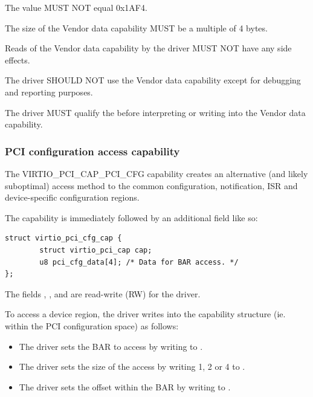 The value  MUST NOT equal 0x1AF4.

The size of the Vendor data capability MUST be a multiple of 4 bytes.

Reads of the Vendor data capability by the driver MUST NOT have any
side effects.


The driver SHOULD NOT use the Vendor data capability except
for debugging and reporting purposes.

The driver MUST qualify the  before
interpreting or writing into the Vendor data capability.

\subsubsection{PCI configuration access capability}\label{sec:Virtio Transport Options / Virtio Over PCI Bus / PCI Device Layout / PCI configuration access capability}

The VIRTIO_PCI_CAP_PCI_CFG capability
creates an alternative (and likely suboptimal) access method to the
common configuration, notification, ISR and device-specific configuration regions.

The capability is immediately followed by an additional field like so:

\begin{lstlisting}
struct virtio_pci_cfg_cap {
        struct virtio_pci_cap cap;
        u8 pci_cfg_data[4]; /* Data for BAR access. */
};
\end{lstlisting}

The fields , ,  and
 are read-write (RW) for the driver.

To access a device region, the driver writes into the capability
structure (ie. within the PCI configuration space) as follows:

\begin{itemize}
\item The driver sets the BAR to access by writing to .

\item The driver sets the size of the access by writing 1, 2 or 4 to
  .

\item The driver sets the offset within the BAR by writing to
  .
\end{itemize}

